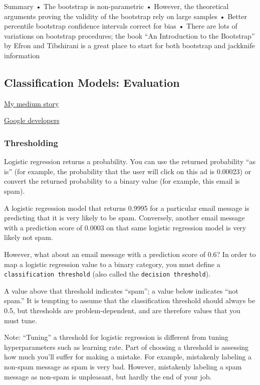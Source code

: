 \documentclass[
]{book}
\begin{document}
Summary
• The bootstrap is non-parametric
• However, the theoretical arguments proving the validity of the bootstrap rely
on large samples
• Better percentile bootstrap confidence intervals correct for bias
• There are lots of variations on bootstrap procedures; the book ``An Introduction to the Bootstrap'' by Efron and Tibshirani is a great place to start for both bootstrap and jackknife information

\hypertarget{classification-models-evaluation}{%
\subsection{Classification Models: Evaluation}\label{classification-models-evaluation}}

\href{https://medium.com/@demrahayan/evaluating-binary-classification-models-with-pyspark-2afc5ac7937f}{My medium story}

\href{https://developers.google.com/machine-learning/crash-course/classification/}{Google developers}

\hypertarget{thresholding}{%
\subsubsection{Thresholding}\label{thresholding}}

Logistic regression returns a probability. You can use the returned probability ``as is'' (for example, the probability that the user will click on this ad is 0.00023) or convert the returned probability to a binary value (for example, this email is spam).

A logistic regression model that returns 0.9995 for a particular email message is predicting that it is very likely to be spam. Conversely, another email message with a prediction score of 0.0003 on that same logistic regression model is very likely not spam.

However, what about an email message with a prediction score of 0.6? In order to map a logistic regression value to a binary category, you must define a \texttt{classification\ threshold} (also called the \texttt{decision\ threshold}).

A value above that threshold indicates ``spam''; a value below indicates ``not spam.'' It is tempting to assume that the classification threshold should always be 0.5, but thresholds are problem-dependent, and are therefore values that you must tune.

Note: ``Tuning'' a threshold for logistic regression is different from tuning hyperparameters such as learning rate. Part of choosing a threshold is assessing how much you'll suffer for making a mistake. For example, mistakenly labeling a non-spam message as spam is very bad. However, mistakenly labeling a spam message as non-spam is unpleasant, but hardly the end of your job.
\end{document}
